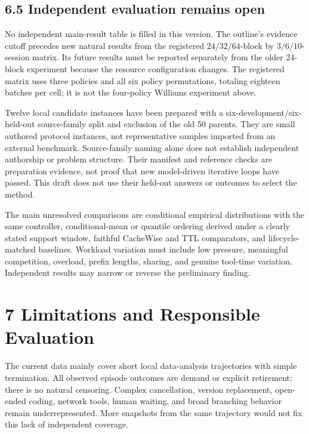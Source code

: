 \documentclass[
  english,
  10pt,
]{article}
\begin{document}
\subsection{6.5 Independent evaluation remains
open}\label{independent-evaluation-remains-open}

No independent main-result table is filled in this version. The
outline's evidence cutoff precedes new natural results from the
registered \(24/32/64\)-block by \(3/6/10\)-session matrix. Its future
results must be reported separately from the older 24-block experiment
because the resource configuration changes. The registered matrix uses
three policies and all six policy permutations, totaling eighteen
batches per cell; it is not the four-policy Williams experiment above.

Twelve local candidate instances have been prepared with a
six-development/six-held-out source-family split and exclusion of the
old 50 parents. They are small authored protocol instances, not
representative samples imported from an external benchmark.
Source-family naming alone does not establish independent authorship or
problem structure. Their manifest and reference checks are preparation
evidence, not proof that new model-driven iterative loops have passed.
This draft does not use their held-out answers or outcomes to select the
method.

The main unresolved comparisons are conditional empirical distributions
with the same controller, conditional-mean or quantile ordering derived
under a clearly stated support window, faithful CacheWise and TTL
comparators, and lifecycle-matched baselines. Workload variation must
include low pressure, meaningful competition, overload, prefix lengths,
sharing, and genuine tool-time variation. Independent results may narrow
or reverse the preliminary finding.

\section{7 Limitations and Responsible
Evaluation}\label{limitations-and-responsible-evaluation}

The current data mainly cover short local data-analysis trajectories
with simple termination. All observed episode outcomes are demand or
explicit retirement; there is no natural censoring. Complex
cancellation, version replacement, open-ended coding, network tools,
human waiting, and broad branching behavior remain underrepresented.
More snapshots from the same trajectory would not fix this lack of
independent coverage.
\end{document}
